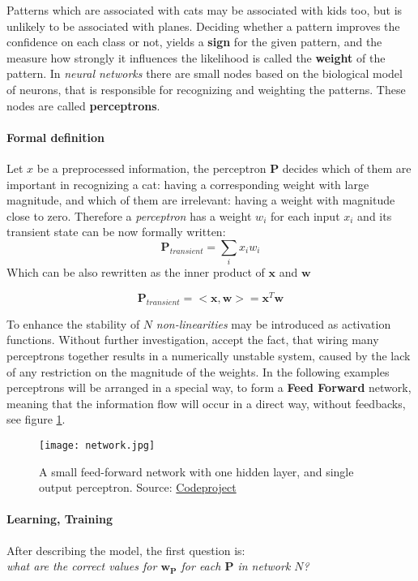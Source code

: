 Patterns which are associated with cats may be associated with kids too, but is unlikely to be associated with planes. Deciding whether a pattern improves the confidence on each class or not, yields a \textbf{sign} for the given pattern, and the measure how strongly it influences the likelihood is called the \textbf{weight} of the pattern.
In \emph{neural networks} there are small nodes based on the biological model of neurons, that is responsible for recognizing and weighting the patterns. These nodes are called \textbf{perceptrons}. 

\paragraph{Formal definition} 
Let $x$ be a preprocessed information, the perceptron $\mathbf{P}$ decides which of them are important in recognizing a cat: having a corresponding weight with large magnitude, and which of them are irrelevant: having a weight with magnitude close to zero. 
Therefore a \emph{perceptron} has a weight $w_i$ for each input $x_i$ and its transient state can be now formally written:
$$
	\mathbf{P}_{transient}=\sum_i x_i w_i
$$
Which can be also rewritten as the inner product of $\mathbf{x}$ and $\mathbf{w}$

$$
	\mathbf{P}_{transient}=<\mathbf{x}, \mathbf{w}>=\mathbf{x}^T\mathbf{w}
$$

To enhance the stability of $N$  \emph{non-linearities} may be introduced as activation functions. Without further investigation, accept the fact, that wiring many perceptrons together results in a numerically unstable system, caused by the lack of any restriction on the magnitude of the weights. In the following examples perceptrons will be arranged in a special way, to form a \textbf{Feed Forward} network, meaning that the information flow will occur in a direct way, without feedbacks, see figure \ref{fig:ff}.

\begin{figure}
	\centering
	\texttt{[image: network.jpg]}
	\caption{A small feed-forward network with one hidden layer, and single output perceptron.
	Source: \href{http://www.codeproject.com/KB/dotnet/predictor/network.jpg}{Codeproject} 	}
	\label{fig:ff}
\end{figure}

\paragraph{Learning, Training}
After describing the model, the first question is:\\
\emph{what are the correct values for $\mathbf{w_P}$ for each $\mathbf{P}$ in network $N$?}


